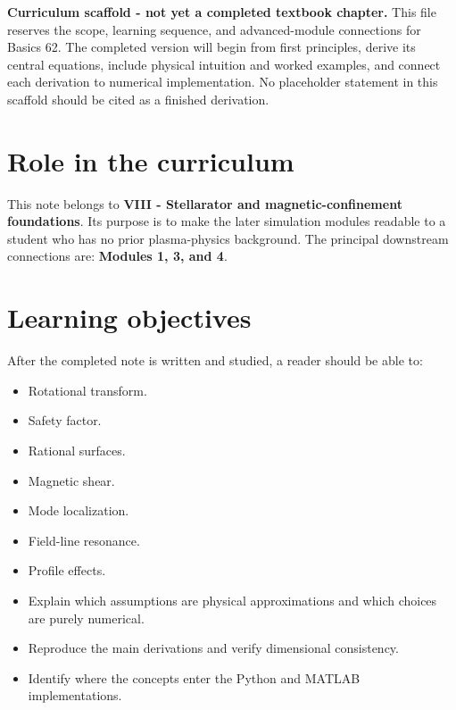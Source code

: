 \documentclass[11pt]{article}
\begin{document}

\begin{overviewbox}
\textbf{Curriculum scaffold - not yet a completed textbook chapter.} This file reserves the scope, learning sequence, and advanced-module connections for Basics 62. The completed version will begin from first principles, derive its central equations, include physical intuition and worked examples, and connect each derivation to numerical implementation. No placeholder statement in this scaffold should be cited as a finished derivation.
\end{overviewbox}

\ProjectTOC

\section{Role in the curriculum}
This note belongs to \textbf{VIII - Stellarator and magnetic-confinement foundations}. Its purpose is to make the later simulation modules readable to a student who has no prior plasma-physics background. The principal downstream connections are: \textbf{Modules 1, 3, and 4}.

\section{Learning objectives}
After the completed note is written and studied, a reader should be able to:
\begin{itemize}[leftmargin=1.6em]
\item Rotational transform.
\item Safety factor.
\item Rational surfaces.
\item Magnetic shear.
\item Mode localization.
\item Field-line resonance.
\item Profile effects.
\item Explain which assumptions are physical approximations and which choices are purely numerical.
\item Reproduce the main derivations and verify dimensional consistency.
\item Identify where the concepts enter the Python and MATLAB implementations.
\end{itemize}
\end{document}

